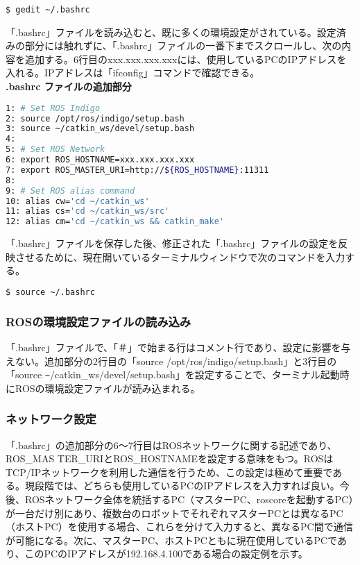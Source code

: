 \begin{lstlisting}[language=ROS]
$ gedit ~/.bashrc
\end{lstlisting}

「.bashrc」ファイルを読み込むと、既に多くの環境設定がされている。設定済みの部分には触れずに、「.bashrc」ファイルの一番下までスクロールし、次の内容を追加する。6行目のxxx.xxx.xxx.xxxには、使用しているPCのIPアドレスを入れる。IPアドレスは「ifconfig」コマンドで確認できる。\\

\noindent\textbf{.bashrc ファイルの追加部分}
\begin{lstlisting}[language=bash]
1: # Set ROS Indigo
2: source /opt/ros/indigo/setup.bash
3: source ~/catkin_ws/devel/setup.bash
4:
5: # Set ROS Network
6: export ROS_HOSTNAME=xxx.xxx.xxx.xxx
7: export ROS_MASTER_URI=http://${ROS_HOSTNAME}:11311
8:
9: # Set ROS alias command
10: alias cw='cd ~/catkin_ws'
11: alias cs='cd ~/catkin_ws/src'
12: alias cm='cd ~/catkin_ws && catkin_make'
\end{lstlisting}

「.bashrc」ファイルを保存した後、修正された「.bashrc」ファイルの設定を反映させるために、現在開いているターミナルウィンドウで次のコマンドを入力する。

\begin{lstlisting}[language=bash]
$ source ~/.bashrc
\end{lstlisting}

\subsubsection{ROSの環境設定ファイルの読み込み}

「.bashrc」ファイルで、「＃」で始まる行はコメント行であり、設定に影響を与えない。追加部分の2行目の「source /opt/ros/indigo/setup.bash」と3行目の「source \verb|~|/catkin\_ws/devel/setup.bash」を設定することで、ターミナル起動時にROSの環境設定ファイルが読み込まれる。

\subsubsection{ネットワーク設定}

「.bashrc」の追加部分の6～7行目はROSネットワークに関する記述であり、ROS\_MAS TER\_URIとROS\_HOSTNAMEを設定する意味をもつ。ROSはTCP/IPネットワークを利用した通信を行うため、この設定は極めて重要である。現段階では、どちらも使用しているPCのIPアドレスを入力すれば良い。今後、ROSネットワーク全体を統括するPC（マスターPC、roscoreを起動するPC）が一台だけ別にあり、複数台のロボットでそれぞれマスターPCとは異なるPC（ホストPC）を使用する場合、これらを分けて入力すると、異なるPC間で通信が可能になる。次に、マスターPC、ホストPCともに現在使用しているPCであり、このPCのIPアドレスが192.168.4.100である場合の設定例を示す。

